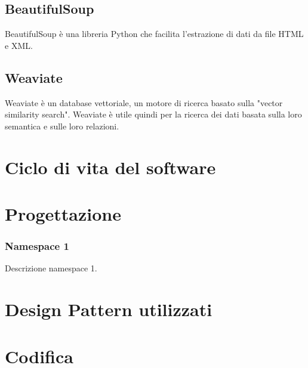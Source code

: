 \subsection{BeautifulSoup}
BeautifulSoup è una libreria Python che facilita l'estrazione di dati da file HTML e XML.
\subsection{Weaviate}
\label{subsec:weav}
Weaviate è un database vettoriale, un motore di ricerca basato sulla "vector similarity search".
Weaviate è utile quindi per la ricerca dei dati basata sulla loro semantica e sulle loro relazioni. 

\section{Ciclo di vita del software}
\label{sec:ciclo-vita-software}

\section{Progettazione}
\label{sec:progettazione}

\subsubsection{Namespace 1} %
Descrizione namespace 1.

\begin{namespacedesc}
\end{namespacedesc}


\section{Design Pattern utilizzati}

\section{Codifica}
